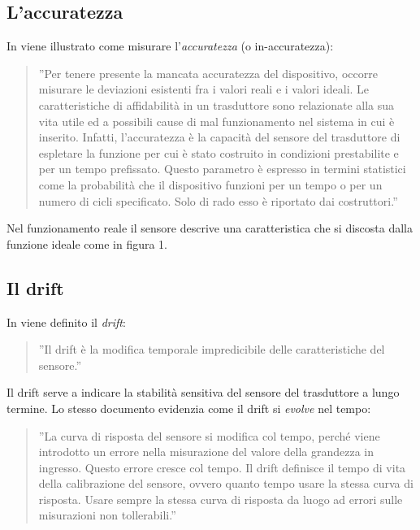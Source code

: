 \documentclass[a4paper]{report} %
\begin{document}
\subsection{L'accuratezza}
In \cite{art:rif.13} viene illustrato come misurare l'\textit{accuratezza} (o in-accuratezza):
\begin{quote}
	''Per tenere presente la mancata accuratezza del dispositivo, occorre misurare le deviazioni esistenti fra i valori reali e i valori ideali. 
	Le caratteristiche di affidabilità in un trasduttore sono relazionate alla sua vita utile ed a possibili cause di mal funzionamento nel sistema in cui è inserito.
	Infatti, l'accuratezza è la capacità del sensore del trasduttore di espletare la funzione per cui è stato costruito in condizioni prestabilite e per un tempo prefissato. Questo parametro è espresso in termini statistici come la probabilità che il dispositivo funzioni per un tempo o per un numero di cicli specificato. Solo di rado esso è riportato dai costruttori.''
\end{quote}
Nel funzionamento reale il sensore descrive una caratteristica che si discosta dalla funzione ideale come in figura 1.

\subsection{Il drift}
In \cite{art:rif.14} viene definito il \textit{drift}:
\begin{quote}
	''Il drift è la modifica temporale impredicibile delle caratteristiche del sensore.''  
\end{quote}
Il drift serve a indicare la stabilità sensitiva del sensore del trasduttore a lungo termine. Lo stesso documento evidenzia come il drift si \textit{evolve} nel tempo:
\begin{quote}
	''La curva di risposta del sensore si modifica col tempo, perché viene introdotto un errore nella misurazione del valore della grandezza in ingresso. Questo errore cresce col tempo. Il drift definisce il tempo di vita della calibrazione del sensore, ovvero quanto tempo usare la stessa curva di risposta. Usare sempre la stessa curva di risposta da luogo ad errori sulle misurazioni non tollerabili.'' 
\end{quote}
\end{document}
